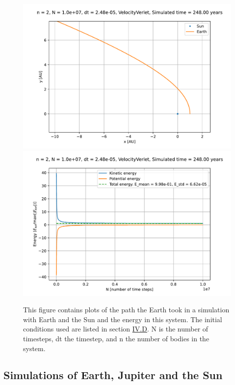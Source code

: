 \documentclass[reprint,english,notitlepage]{revtex4-1}  %
\begin{document}
\begin{figure}[H]
\includegraphics[scale=0.5]{../data/figures/escapevelocity/se_esc_9_orbit2D_zoomed.pdf}
\includegraphics[scale=0.5]{../data/figures/escapevelocity/se_esc_9_energy.pdf}
\caption{This figure contains plots of the path the Earth took in a simulation with Earth and the Sun and the energy in this system. The initial conditions used are listed in section \hyperref[sec:IV:d]{IV.D}. N is the number of timesteps, dt the timestep, and n the number of bodies in the system.}
\label{fig:escvel_9}
\end{figure}



\subsection{Simulations of Earth, Jupiter and the Sun} \label{sec:IV:e}
\end{document}
